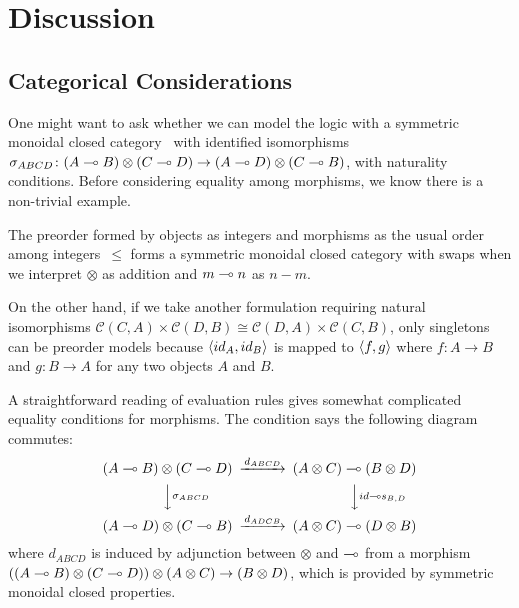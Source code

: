 \section{Discussion}

\subsection{Categorical Considerations}
One might want to ask whether we can model the logic with
a symmetric monoidal closed
category~\citep{blute2004category}%
  with identified isomorphisms
$\sigma_{ABCD}\colon (A\multimap B)\otimes (C\multimap D)\rightarrow (A\multimap D) \otimes
 (C\multimap B)$, with naturality conditions.
 Before considering equality among morphisms,
 we know there is a non-trivial example.
  \begin{example}
   \label{smcc}
   The preorder formed by objects as integers and morphisms as the usual
   order among integers~$\le$
   forms a symmetric monoidal closed category with swaps
   when we interpret $\otimes$ as addition and
   $m \multimap n$ as $n-m$.
  \end{example}
  On the other hand,
  if we take another formulation requiring natural isomorphisms
  $\mathcal C(C,A)\times\mathcal C(D,B) \cong \mathcal C(D,A)\times
  \mathcal C{(C,B)}$,
  only singletons can be preorder models because $\langle{id_A,id_B}\rangle$ is
  mapped to $\langle{f,g}\rangle$ where $f\colon A\rightarrow B$ and $g\colon
  B\rightarrow A$ for any two objects $A$ and $B$.

A straightforward reading of evaluation rules gives somewhat complicated
equality conditions for morphisms.
The condition says the following diagram commutes:
\[
   \begin{CD}
    (A\limp B)\otimes (C\limp D) @>{d_{ABCD}}>> (A\otimes C)\limp(B\otimes D)\\
    @VV{\sigma_{ABCD}}V @VV{id\limp s_{B,D}}V\\
    (A\limp D)\otimes (C\limp B) @>{d_{ADCB}}>> (A\otimes C)\limp (D\otimes B)
   \end{CD}
\]
 where $d_{ABCD}$ is induced by adjunction between $\otimes$ and $\multimap$
 from a morphism
 $((A\multimap B)\otimes (C\multimap D))\otimes (A\otimes C)\rightarrow
 (B\otimes D)$, which is provided by symmetric monoidal closed
 properties.

